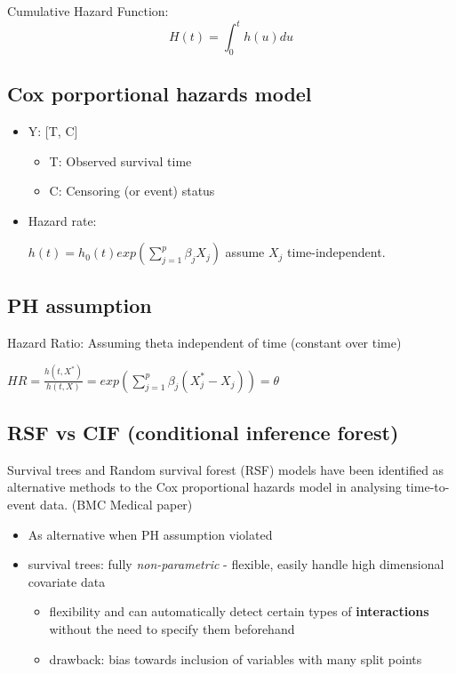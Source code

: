 \documentclass[
]{article}
\providecommand{\tightlist}{%
  \setlength{\itemsep}{0pt}\setlength{\parskip}{0pt}}
\begin{document}
Cumulative Hazard Function: \[H(t)=\int_{0}^{t} h(u) du\]

\hypertarget{cox-porportional-hazards-model}{%
\subsection{Cox porportional hazards
model}\label{cox-porportional-hazards-model}}

\begin{itemize}
\item
  Y: {[}T, C{]}

  \begin{itemize}
  \tightlist
  \item
    T: Observed survival time
  \item
    C: Censoring (or event) status
  \end{itemize}
\item
  Hazard rate:

  \(h(t)=h_0(t)exp(\sum_{j=1}^p\beta_jX_j)\) assume \(X_j\)
  time-independent.
\end{itemize}

\hypertarget{ph-assumption}{%
\subsection{PH assumption}\label{ph-assumption}}

Hazard Ratio: Assuming theta independent of time (constant over time)

\(HR=\frac{h(t,X^*)}{h(t,X)}=exp(\sum_{j=1}^p\beta_j(X_j^*-X_j))=\theta\)

\hypertarget{rsf-vs-cif-conditional-inference-forest}{%
\subsection{RSF vs CIF (conditional inference
forest)}\label{rsf-vs-cif-conditional-inference-forest}}

Survival trees and Random survival forest (RSF) models have been
identified as alternative methods to the Cox proportional hazards model
in analysing time-to-event data. (BMC Medical paper)

\begin{itemize}
\tightlist
\item
  As alternative when PH assumption violated
\item
  survival trees: fully \emph{non-parametric} - flexible, easily handle
  high dimensional covariate data

  \begin{itemize}
  \tightlist
  \item
    flexibility and can automatically detect certain types of
    \textbf{interactions} without the need to specify them beforehand
  \item
    drawback: bias towards inclusion of variables with many split points
  \end{itemize}
\end{itemize}
\end{document}
